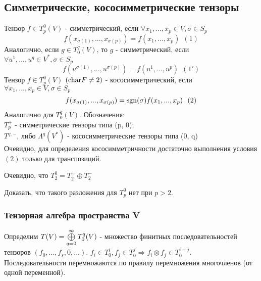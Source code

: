 \subsection{Симметрические, кососимметрические тензоры}
\begin{definition}
    Тензор $f \in T_p^0(V)$ - симметрический, если $\forall x_1,...,x_p \in V, \sigma \in S_p$
    \[f(x_{\sigma(1)},...,x_{\sigma(p)}) = f(x_1,...,x_p) \ \ (1)\]
    Аналогично, если $g \in T_0^q(V)$, то $g$ - симметрический, если $\forall u^1,...,u^q \in V^*, \sigma \in S_p$
    \[f(u^{\sigma(1)},...,u^{\sigma(p)}) = f(u^1,...,u^p) \ \ (1')\] 
    Тензор $f \in T_p^0(V)$ $(\textup{char} F \neq 2)$ - кососимметрический, если $\forall x_1,...,x_p \in V, \sigma \in S_p$
    \[f(x_{\sigma(1)},...,x_{\sigma(p)}) = \operatorname{sgn}(\sigma)f(x_1,...,x_p) \ \ (2)\]
    Аналогично для $T_0^q(V)$.
    Обозначения:\\
    $T_p^+$ - симметрические тензоры типа (p, 0);\\
    $T^{q, -}$, либо $\Lambda^q(V^*)$ - кососимметрические тензоры типа (0, q)\\
    Очевидно, для определения кососимметричности достаточно выполнения условия $(2)$ только для транспозиций.
\end{definition}
Очевидно, что $T_2^0 = T_2^+ \oplus T_2^-$
\begin{exercise}
    Доказать, что такого разложения для $T_p^0$ нет при $p > 2$.
\end{exercise}
\subsubsection*{Тензорная алгебра пространства V}
Определим $T(V) = \circledplus \limits_{q = 0}^\infty T_0^q(V)$ - множество финитных последовательностей тензоров $(f_0,...,f_s, 0,...)$. $f_i \in T_0^i, f_j \in T_0^j \Longrightarrow f_i \otimes f_j \in T_0^{i+j}$.\\
Последовательности перемножаются по правилу перемножения многочленов (от одной переменной).
